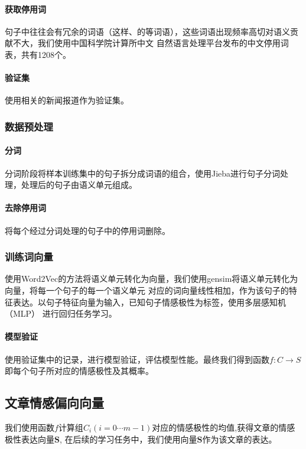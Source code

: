 \documentclass[UTF8]{ctexart}
\begin{document}
\paragraph{获取停用词}
句子中往往会有冗余的词语（这样、的等词语），这些词语出现频率高切对语义贡献不大，我们使用中国科学院计算所中文
自然语言处理平台发布的中文停用词表，共有1208个。
\paragraph{验证集}
使用相关的新闻报道作为验证集。
\subsubsection*{数据预处理}
\paragraph{分词}
分词阶段将样本训练集中的句子拆分成词语的组合，使用Jieba进行句子分词处理，处理后的句子由语义单元组成。
\paragraph{去除停用词}
将每个经过分词处理的句子中的停用词删除。
\subsubsection*{训练词向量}
使用Word2Vec的方法将语义单元转化为向量，我们使用gensim将语义单元转化为向量，将每一个句子的每一个语义单元
对应的词向量线性相加，作为该句子的特征表达。以句子特征向量为输入，已知句子情感极性为标签，使用多层感知机（MLP）
进行回归任务学习。
\paragraph{模型验证}
使用验证集中的记录，进行模型验证，评估模型性能。最终我们得到函数$f:C \to S$即每个句子所对应的情感极性及其概率。
\subsection{文章情感偏向向量}
我们使用函数$f$计算组$C_i (i=0 \cdots m-1)$对应的情感极性的均值,获得文章的情感极性表达向量$\boldsymbol{S}$,
在后续的学习任务中，我们使用向量$\boldsymbol{S}$作为该文章的表达。
\end{document}
